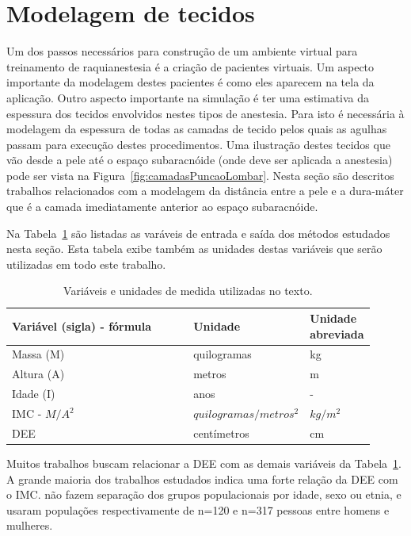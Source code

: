 \section{Modelagem de tecidos}
\label{sec:modelagemTecidos}

Um dos passos necessários para construção de um ambiente virtual para treinamento de raquianestesia é a criação de pacientes virtuais. Um aspecto importante da modelagem destes pacientes é como eles aparecem na tela da aplicação. Outro aspecto importante na simulação é ter uma estimativa da espessura dos tecidos envolvidos nestes tipos de anestesia. Para isto é necessária à modelagem da espessura de todas as camadas de tecido pelos quais as agulhas passam para execução destes procedimentos. Uma ilustração destes tecidos que vão desde a pele até o espaço subaracnóide (onde deve ser aplicada a anestesia) pode ser vista na Figura~\ref{fig:camadasPuncaoLombar}. Nesta seção são descritos trabalhos relacionados com a modelagem da distância entre a pele e a dura-máter que é a camada imediatamente anterior ao espaço subaracnóide.

Na Tabela~\ref{tab:variaveisUnidades} são listadas as varáveis de entrada e saída dos métodos estudados nesta seção. Esta tabela exibe também as unidades destas variáveis que serão utilizadas em todo este trabalho.

\begin{table}[!ht]
\begin{center}
\caption{Variáveis e unidades de medida utilizadas no texto.}
\label{tab:variaveisUnidades}
\begin{tabular}{|p{0.53\linewidth}|p{0.25\linewidth}|p{0.13\linewidth}|}
\hline
\textbf{Variável (sigla) - fórmula} & \textbf{Unidade} & \textbf{Unidade abreviada}\\
\hline\hline
Massa (M) & quilogramas & kg \\
Altura (A) & metros & m \\
Idade (I) & anos & - \\
\acrfull{IMC} - $M/A^2$ & $quilogramas/metros^2$ & $kg/m^2$ \\
\acrfull{DEE} & centímetros & cm \\
\hline
\end{tabular}
\end{center}
\end{table}

Muitos trabalhos buscam relacionar a \acrfull{DEE} com as demais variáveis da Tabela~\ref{tab:variaveisUnidades}. A grande maioria dos trabalhos estudados indica uma forte relação da \acrshort{DEE} com o \acrshort{IMC}. \textcite{Adegboye2017, Galbraith2018} não fazem separação dos grupos populacionais por idade, sexo ou etnia, e usaram populações respectivamente de n=120 e n=317 pessoas entre homens e mulheres.

